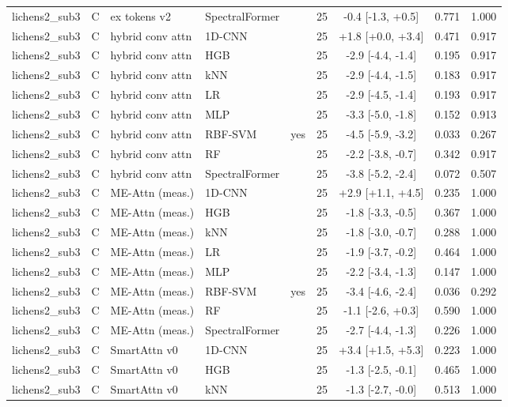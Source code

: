 \begin{tabular}{lllllcccc}
lichens2_sub3 & C & ex tokens v2 & SpectralFormer &  & 25 & -0.4 [-1.3, +0.5] & 0.771 & 1.000 \\
lichens2_sub3 & C & hybrid conv attn & 1D-CNN &  & 25 & +1.8 [+0.0, +3.4] & 0.471 & 0.917 \\
lichens2_sub3 & C & hybrid conv attn & HGB &  & 25 & -2.9 [-4.4, -1.4] & 0.195 & 0.917 \\
lichens2_sub3 & C & hybrid conv attn & kNN &  & 25 & -2.9 [-4.4, -1.5] & 0.183 & 0.917 \\
lichens2_sub3 & C & hybrid conv attn & LR &  & 25 & -2.9 [-4.5, -1.4] & 0.193 & 0.917 \\
lichens2_sub3 & C & hybrid conv attn & MLP &  & 25 & -3.3 [-5.0, -1.8] & 0.152 & 0.913 \\
lichens2_sub3 & C & hybrid conv attn & RBF-SVM & yes & 25 & -4.5 [-5.9, -3.2] & 0.033 & 0.267 \\
lichens2_sub3 & C & hybrid conv attn & RF &  & 25 & -2.2 [-3.8, -0.7] & 0.342 & 0.917 \\
lichens2_sub3 & C & hybrid conv attn & SpectralFormer &  & 25 & -3.8 [-5.2, -2.4] & 0.072 & 0.507 \\
lichens2_sub3 & C & ME-Attn (meas.) & 1D-CNN &  & 25 & +2.9 [+1.1, +4.5] & 0.235 & 1.000 \\
lichens2_sub3 & C & ME-Attn (meas.) & HGB &  & 25 & -1.8 [-3.3, -0.5] & 0.367 & 1.000 \\
lichens2_sub3 & C & ME-Attn (meas.) & kNN &  & 25 & -1.8 [-3.0, -0.7] & 0.288 & 1.000 \\
lichens2_sub3 & C & ME-Attn (meas.) & LR &  & 25 & -1.9 [-3.7, -0.2] & 0.464 & 1.000 \\
lichens2_sub3 & C & ME-Attn (meas.) & MLP &  & 25 & -2.2 [-3.4, -1.3] & 0.147 & 1.000 \\
lichens2_sub3 & C & ME-Attn (meas.) & RBF-SVM & yes & 25 & -3.4 [-4.6, -2.4] & 0.036 & 0.292 \\
lichens2_sub3 & C & ME-Attn (meas.) & RF &  & 25 & -1.1 [-2.6, +0.3] & 0.590 & 1.000 \\
lichens2_sub3 & C & ME-Attn (meas.) & SpectralFormer &  & 25 & -2.7 [-4.4, -1.3] & 0.226 & 1.000 \\
lichens2_sub3 & C & SmartAttn v0 & 1D-CNN &  & 25 & +3.4 [+1.5, +5.3] & 0.223 & 1.000 \\
lichens2_sub3 & C & SmartAttn v0 & HGB &  & 25 & -1.3 [-2.5, -0.1] & 0.465 & 1.000 \\
lichens2_sub3 & C & SmartAttn v0 & kNN &  & 25 & -1.3 [-2.7, -0.0] & 0.513 & 1.000 \\

\end{tabular}
